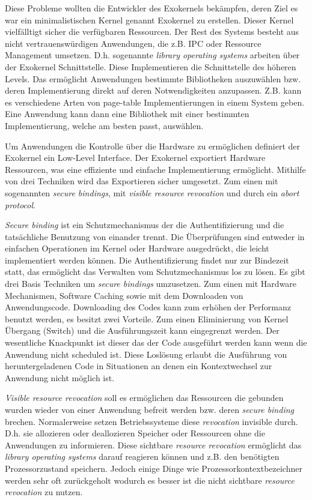 \documentclass[11pt,technote]{IEEEtran}
\begin{document}
      Diese Probleme wollten die Entwickler des Exokernels bek\"ampfen, deren Ziel es war ein minimalistischen Kernel genannt Exokernel zu erstellen.
      Dieser Kernel vielf\"alltigt sicher die verf\"ugbaren Ressourcen. Der Rest des Systems besteht aus nicht vertrauensw\"urdigen Anwendungen, die
      z.B. IPC oder Ressource Management umsetzen. D.h. sogenannte \textit{library operating systems} arbeiten \"uber der Exokernel Schnittstelle. 
      Diese Implementieren die Schnittstelle des h\"oheren Levels. Das erm\"oglicht Anwendungen bestimmte Bibliotheken auszuw\"ahlen bzw.
      deren Implementierung direkt auf deren Notwendigkeiten anzupassen. Z.B. kann es verschiedene Arten von page-table Implementierungen
      in einem System geben. Eine Anwendung kann dann eine Bibliothek mit einer bestimmten Implementierung, welche am besten passt, ausw\"ahlen.
        
      Um Anwendungen die Kontrolle \"uber die Hardware zu erm\"oglichen definiert der Exokernel ein Low-Level Interface.
      Der Exokernel exportiert Hardware Ressourcen, was eine effiziente und einfache Implementierung erm\"oglicht.
      Mithilfe von drei Techniken wird das Exportieren sicher umgesetzt. Zum einen mit sogenannten \textit{secure bindings}, 
      mit \textit{visible resource revocation} und durch ein \textit{abort protocol}. 
        
      \textit{Secure binding} ist ein Schutzmechanismus der die Authentifizierung und die tats\"achliche Benutzung von einander trennt.
      Die \"Uberpr\"ufungen sind entweder in einfachen Operationen im Kernel oder Hardware ausgedr\"uckt, die leicht implementiert werden k\"onnen.
      Die Authentifizierung findet nur zur Bindezeit statt, das erm\"oglicht das Verwalten vom Schutzmechanismus los zu l\"osen. Es gibt drei Basis Techniken
      um \textit{secure bindings} umzusetzen. Zum einen mit Hardware Mechanismen, Software Caching sowie mit dem Downloaden von Anwendungscode.
      Downloading des Codes kann zum erh\"ohen der Performanz benutzt werden, es besitzt zwei Vorteile. Zum einen Eliminierung von Kernel \"Ubergang (Switch)
      und die Ausf\"uhrungszeit kann eingegrenzt werden. Der wesentliche Knackpunkt ist dieser das der Code ausgef\"uhrt werden kann wenn die Anwendung nicht
      scheduled ist. Diese Losl\"osung erlaubt die Ausf\"uhrung von heruntergeladenen Code in Situationen an denen ein Kontextwechsel zur
      Anwendung nicht m\"oglich ist.
        
      \textit{Visible resource revocation} soll es erm\"oglichen das Ressourcen die gebunden wurden wieder von einer Anwendung befreit werden  
      bzw. deren \textit{secure binding} brechen. Normalerweise setzen Betriebssysteme diese \textit{revocation} invisible durch. 
      D.h. sie allozieren oder deallozieren Speicher oder Ressourcen ohne die Anwendungen zu informieren.
      Diese sichtbare \textit{resource revocation} erm\"oglicht das \textit{library operating systems} darauf reagieren k\"onnen und
      z.B. den ben\"otigten Prozessorzustand speichern. Jedoch einige Dinge wie Prozessorkontextbezeichner werden sehr oft zur\"uckgeholt wodurch
      es besser ist die nicht sichtbare \textit{resource revocation} zu nutzen.
        
\end{document}
